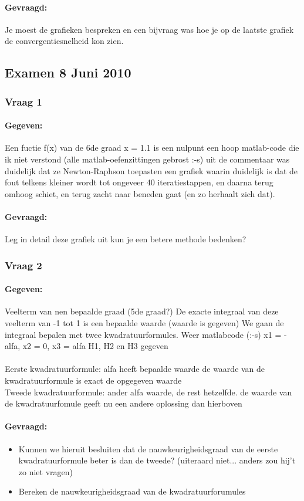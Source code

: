 \documentclass[12pt]{article}
\begin{document}
\paragraph{Gevraagd:} Je moest de grafieken bespreken en een bijvraag was hoe je op de laatste grafiek de convergentiesnelheid kon zien.
\subsection{Examen 8 Juni 2010}
\subsubsection{Vraag 1}
\paragraph{Gegeven:} Een fuctie f(x) van de 6de graad x = 1.1 is een nulpunt een hoop matlab-code die ik niet verstond (alle matlab-oefenzittingen gebrost :-s) uit de commentaar was duidelijk dat ze Newton-Raphson toepasten een grafiek waarin duidelijk is dat de fout telkens kleiner wordt tot ongeveer 40 iteratiestappen, en daarna terug omhoog schiet, en terug zacht naar beneden gaat (en zo herhaalt zich dat).
\paragraph{Gevraagd:}  Leg in detail deze grafiek uit kun je een betere methode bedenken?
\subsubsection{Vraag 2}
\paragraph{Gegeven:} Veelterm van nen bepaalde graad (5de graad?) De exacte integraal van deze veelterm van -1 tot 1 is een bepaalde waarde (waarde is gegeven) We gaan de integraal bepalen met twee kwadratuurformules. Weer matlabcode (:-s) x1 = -alfa, x2 = 0, x3 = alfa H1, H2 en H3 gegeven \\
\\
Eerste kwadratuurformule: alfa heeft bepaalde waarde de waarde van de kwadratuurformule is exact de opgegeven waarde
\\
Tweede kwadratuurformule: ander alfa waarde, de rest hetzelfde. de waarde van de kwadratuurfomule geeft nu een andere oplossing dan hierboven
\paragraph{Gevraagd:}
\begin{itemize}
	\item Kunnen we hieruit besluiten dat de nauwkeurigheidsgraad van de eerste kwadratuurformule beter is dan de tweede? (uiteraard niet... anders zou hij't zo niet vragen)
	\item Bereken de nauwkeurigheidsgraad van de kwadratuurforumules
\end{itemize}
\end{document}
